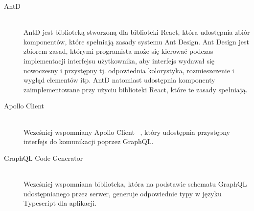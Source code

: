 \begin{description}
  \item[AntD] \hfill \\ AntD jest biblioteką stworzoną dla biblioteki React, która udostępnia zbiór komponentów, które spełniają zasady systemu Ant Design. Ant Design jest zbiorem zasad, którymi programista może się kierować podczas implementacji interfejsu użytkownika, aby interfejs wydawał się nowoczesny i przystępny tj. odpowiednia kolorystyka, rozmieszczenie i wygląd elementów itp. AntD natomiast udostępnia komponenty zaimplementowane przy użyciu biblioteki React, które te zasady spełniają.
  \item[Apollo Client] \hfill \\ Wcześniej wspomniany Apollo Client ~\cite{ref_apollo_doc}, który udostępnia przystępny interfejs do komunikacji poprzez GraphQL.
  \item[GraphQL Code Generator] \hfill \\ Wcześniej wspomniana biblioteka, która na podstawie schematu GraphQL udostępnianego przez serwer, generuje odpowiednie typy w języku Typescript dla aplikacji.

\end{description}

